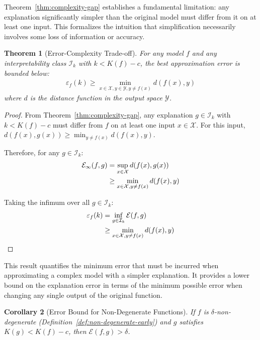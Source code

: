 \documentclass[11pt,letter,leqno]{article}
\newtheorem{theorem}{Theorem}[section]
\newtheorem{corollary}[theorem]{Corollary}
\begin{document}
Theorem~\ref{thm:complexity-gap} establishes a fundamental limitation: any explanation significantly simpler than the original model must differ from it on at least one input.  This formalizes the intuition that simplification necessarily involves some loss of information or accuracy.

\begin{theorem}[Error-Complexity Trade-off]
\label{thm:error-complexity}
For any model $f$ and any interpretability class $\mathcal{I}_k$ with $k < K(f) - c$, the best approximation error is bounded below:
\begin{align}
\varepsilon_f(k) \geq \min_{x \in \mathcal{X}, y \in \mathcal{Y}, y \neq f(x)} d(f(x), y)
\end{align}
where $d$ is the distance function in the output space $\mathcal{Y}$.
\end{theorem}

\begin{proof}
From Theorem~\ref{thm:complexity-gap}, any explanation $g \in \mathcal{I}_k$ with $k < K(f) - c$ must differ from $f$ on at least one input $x \in \mathcal{X}$.  For this input, $d(f(x), g(x)) \geq \min_{y \neq f(x)} d(f(x), y)$.

Therefore, for any $g \in \mathcal{I}_k$:
\begin{align}
\mathcal{E}_{\infty}(f, g) &= \sup_{x \in \mathcal{X}} d(f(x), g(x)) \notag \\
&\geq \min_{x \in \mathcal{X}, y \neq f(x)} d(f(x), y)
\end{align}

Taking the infimum over all $g \in \mathcal{I}_k$:
\begin{align}
\varepsilon_f(k) &= \inf_{g \in \mathcal{I}_k} \mathcal{E}(f, g) \notag \\
&\geq \min_{x \in \mathcal{X}, y \neq f(x)} d(f(x), y) \qedhere
\end{align}
\end{proof}

This result quantifies the minimum error that must be incurred when approximating a complex model with a simpler explanation.  It provides a lower bound on the explanation error in terms of the minimum possible error when changing any single output of the original function.

\begin{corollary}[Error Bound for Non-Degenerate Functions]
\label{cor:error-nondegen}
If $f$ is $\delta$-non-degenerate (Definition~\ref{def:non-degenerate-early}) 
and $g$ satisfies $K(g) < K(f) - c$, then $\mathcal{E}(f,g) > \delta$.
\end{corollary}
\end{document}
